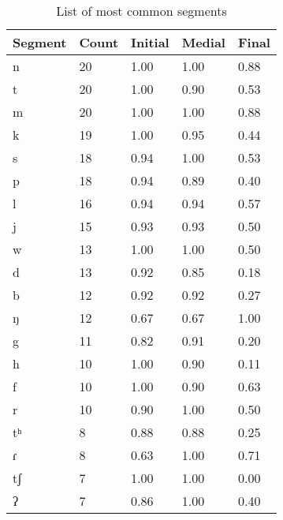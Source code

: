 \begin{table}[]
\centering
\caption{List of most common segments}
\label{tab:segment_list}
\begin{tabular}{|l|l|l|l|l|}
\hline
Segment & Count & Initial & Medial & Final \\ \hline
n       & 20    & 1.00    & 1.00   & 0.88  \\ \hline
t       & 20    & 1.00    & 0.90   & 0.53  \\ \hline
m       & 20    & 1.00    & 1.00   & 0.88  \\ \hline
k       & 19    & 1.00    & 0.95   & 0.44  \\ \hline
s       & 18    & 0.94    & 1.00   & 0.53  \\ \hline
p       & 18    & 0.94    & 0.89   & 0.40  \\ \hline
l       & 16    & 0.94    & 0.94   & 0.57  \\ \hline
j       & 15    & 0.93    & 0.93   & 0.50  \\ \hline
w       & 13    & 1.00    & 1.00   & 0.50  \\ \hline
d       & 13    & 0.92    & 0.85   & 0.18  \\ \hline
b       & 12    & 0.92    & 0.92   & 0.27  \\ \hline
ŋ       & 12    & 0.67    & 0.67   & 1.00  \\ \hline
g       & 11    & 0.82    & 0.91   & 0.20  \\ \hline
h       & 10    & 1.00    & 0.90   & 0.11  \\ \hline
f       & 10    & 1.00    & 0.90   & 0.63  \\ \hline
r       & 10    & 0.90    & 1.00   & 0.50  \\ \hline
tʰ      & 8     & 0.88    & 0.88   & 0.25  \\ \hline
ɾ       & 8     & 0.63    & 1.00   & 0.71  \\ \hline
tʃ      & 7     & 1.00    & 1.00   & 0.00  \\ \hline
ʔ       & 7     & 0.86    & 1.00   & 0.40  \\ \hline
\end{tabular}
\end{table}